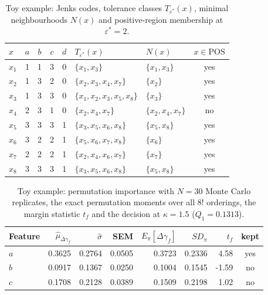 \begin{table}[H]
\centering
\caption{Toy example: Jenks codes, tolerance classes $T_{\varepsilon^*}(x)$, minimal neighbourhoods $N(x)$ and positive-region membership at $\varepsilon^*=2$.}
\label{tab:toy_steps}
\begin{tabular}{lccccll c}
\toprule
$x$ & $a$ & $b$ & $c$ & $d$ & $T_{\varepsilon^*}(x)$ & $N(x)$ & $x\in\mathrm{POS}$ \\
\midrule
$x_{1}$ & 1 & 1 & 3 & 0 & $\{x_{1},x_{3}\}$ & $\{x_{1},x_{3}\}$ & yes \\
$x_{2}$ & 1 & 3 & 2 & 0 & $\{x_{2},x_{3},x_{4},x_{7}\}$ & $\{x_{2}\}$ & yes \\
$x_{3}$ & 1 & 3 & 3 & 0 & $\{x_{1},x_{2},x_{3},x_{5},x_{8}\}$ & $\{x_{3}\}$ & yes \\
$x_{4}$ & 2 & 3 & 1 & 0 & $\{x_{2},x_{4},x_{7}\}$ & $\{x_{2},x_{4},x_{7}\}$ & no \\
$x_{5}$ & 3 & 3 & 3 & 1 & $\{x_{3},x_{5},x_{6},x_{8}\}$ & $\{x_{5},x_{8}\}$ & yes \\
$x_{6}$ & 3 & 2 & 2 & 1 & $\{x_{5},x_{6},x_{7},x_{8}\}$ & $\{x_{6}\}$ & yes \\
$x_{7}$ & 2 & 2 & 2 & 1 & $\{x_{2},x_{4},x_{6},x_{7}\}$ & $\{x_{7}\}$ & yes \\
$x_{8}$ & 3 & 3 & 3 & 1 & $\{x_{3},x_{5},x_{6},x_{8}\}$ & $\{x_{5},x_{8}\}$ & yes \\
\bottomrule
\end{tabular}
\end{table}

\begin{table}[H]
\centering
\caption{Toy example: permutation importance with $N=30$ Monte Carlo replicates, the exact permutation moments over all $8!$ orderings, the margin statistic $t_f$ and the decision at $\kappa=1.5$ ($Q_1=0.1313$).}
\label{tab:toy_scores}
\begin{tabular}{lrrrrrrc}
\toprule
Feature & $\hat\mu_{\Delta\gamma_f}$ & $\hat\sigma$ & SEM & $E_\pi[\Delta\gamma_f]$ & $SD_\pi$ & $t_f$ & kept \\
\midrule
$a$ & 0.3625 & 0.2764 & 0.0505 & 0.3723 & 0.2336 & 4.58 & yes \\
$b$ & 0.0917 & 0.1367 & 0.0250 & 0.1004 & 0.1545 & -1.59 & no \\
$c$ & 0.1708 & 0.2128 & 0.0389 & 0.1509 & 0.2198 & 1.02 & no \\
\bottomrule
\end{tabular}
\end{table}